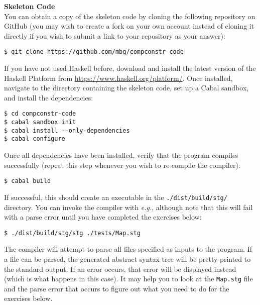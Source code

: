 \documentclass[10pt,a4paper]{exam} %
\begin{document}
\begin{mdframed}
\textbf{Skeleton Code}\\
You can obtain a copy of the skeleton code by cloning the following repository on GitHub (you may wish to create a fork on your own account instead of cloning it directly if you wish to submit a link to your repository as your answer):
\begin{verbatim}
$ git clone https://github.com/mbg/compconstr-code
\end{verbatim}
If you have not used Haskell before, download and install the latest version of the Haskell Platform from \url{https://www.haskell.org/platform/}. Once installed, navigate to the directory containing the skeleton code, set up a Cabal sandbox, and install the dependencies:
\begin{verbatim}
$ cd compconstr-code
$ cabal sandbox init
$ cabal install --only-dependencies
$ cabal configure
\end{verbatim}
Once all dependencies have been installed, verify that the program compiles successfully (repeat this step whenever you wish to re-compile the compiler):
\begin{verbatim}
$ cabal build
\end{verbatim}
If successful, this should create an executable in the \texttt{./dist/build/stg/} directory. You can invoke the compiler with \emph{e.g.}, although note that this will fail with a parse error until you have completed the exercises below:
\begin{verbatim}
$ ./dist/build/stg/stg ./tests/Map.stg
\end{verbatim} 
The compiler will attempt to parse all files specified as inputs to the program. If a file can be parsed, the generated abstract syntax tree will be pretty-printed to the standard output. If an error occurs, that error will be displayed instead (which is what happens in this case). It may help you to look at the \texttt{Map.stg} file and the parse error that occurs to figure out what you need to do for the exercises below.
\end{mdframed}
\end{document}
